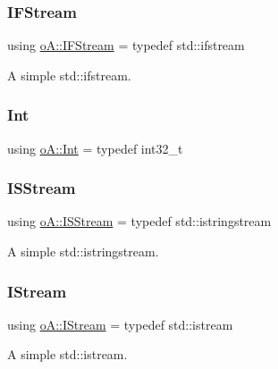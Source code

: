 \subsubsection{\texorpdfstring{I\+F\+Stream}{IFStream}}
{\footnotesize\ttfamily using \mbox{\hyperlink{namespaceo_a_a5cea26f1078da3e5c2fc4529d6459c94}{o\+A\+::\+I\+F\+Stream}} = typedef std\+::ifstream}



A simple std\+::ifstream. 

\mbox{\label{namespaceo_a_aa575525a7b0116822c73d43fa671a58c}} 
\subsubsection{\texorpdfstring{Int}{Int}}
{\footnotesize\ttfamily using \mbox{\hyperlink{namespaceo_a_aa575525a7b0116822c73d43fa671a58c}{o\+A\+::\+Int}} = typedef int32\+\_\+t}

\mbox{\label{namespaceo_a_a60595f5d8b3d5dbbb9d1ed512917b09b}} 
\subsubsection{\texorpdfstring{I\+S\+Stream}{ISStream}}
{\footnotesize\ttfamily using \mbox{\hyperlink{namespaceo_a_a60595f5d8b3d5dbbb9d1ed512917b09b}{o\+A\+::\+I\+S\+Stream}} = typedef std\+::istringstream}



A simple std\+::istringstream. 

\mbox{\label{namespaceo_a_ae8cec630e608110423350d900ee22e73}} 
\subsubsection{\texorpdfstring{I\+Stream}{IStream}}
{\footnotesize\ttfamily using \mbox{\hyperlink{namespaceo_a_ae8cec630e608110423350d900ee22e73}{o\+A\+::\+I\+Stream}} = typedef std\+::istream}



A simple std\+::istream. 

\mbox{\label{namespaceo_a_a32faab7cf59b3e127611687f2b55b72e}} 
